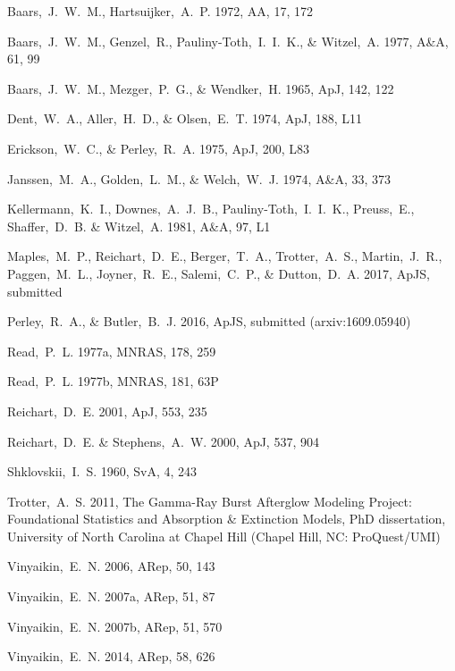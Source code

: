 \documentclass[fleqn,usenatbib]{mnras}
\begin{document}
\begin{thebibliography}{}
Baars,~J.~W.~M., Hartsuijker,~A.~P. 1972, AA, 17, 172

Baars,~J.~W.~M., Genzel,~R., Pauliny-Toth,~I.~I.~K., \& Witzel,~A. 1977, A\&A, 61, 99

Baars,~J.~W.~M., Mezger,~P.~G., \& Wendker,~H. 1965, ApJ, 142, 122

Dent,~W.~A., Aller,~H.~D., \& Olsen,~E.~T. 1974, ApJ, 188, L11

Erickson,~W.~C., \& Perley,~R.~A. 1975, ApJ, 200, L83

Janssen,~M.~A., Golden,~L.~M., \& Welch,~W.~J. 1974, A\&A, 33, 373

Kellermann,~K.~I., Downes,~A.~J.~B., Pauliny-Toth,~I.~I.~K., Preuss,~E., Shaffer,~D.~B. \& Witzel,~A. 1981, A\&A, 97, L1

Maples,~M.~P., Reichart,~D.~E., Berger,~T.~A., Trotter,~A.~S., Martin,~J.~R., Paggen,~M.~L., Joyner,~R.~E., Salemi,~C.~P., \& Dutton,~D.~A. 2017, ApJS, submitted

Perley,~R.~A., \& Butler,~B.~J. 2016, ApJS, submitted (arxiv:1609.05940)

Read,~P.~L. 1977a, MNRAS, 178, 259

Read,~P.~L. 1977b, MNRAS, 181, 63P

Reichart,~D.~E. 2001, ApJ, 553, 235

Reichart,~D.~E. \& Stephens,~A.~W. 2000, ApJ, 537, 904

Shklovskii,~I.~S. 1960, SvA, 4, 243

Trotter,~A.~S. 2011, The Gamma-Ray Burst Afterglow Modeling Project:  Foundational Statistics and Absorption \& Extinction Models, PhD dissertation, University of North Carolina at Chapel Hill (Chapel Hill, NC:  ProQuest/UMI)

Vinyaikin,~E.~N. 2006, ARep, 50, 143

Vinyaikin,~E.~N. 2007a, ARep, 51, 87

Vinyaikin,~E.~N. 2007b, ARep, 51, 570

Vinyaikin,~E.~N. 2014, ARep, 58, 626

\end{thebibliography}
\end{document}
